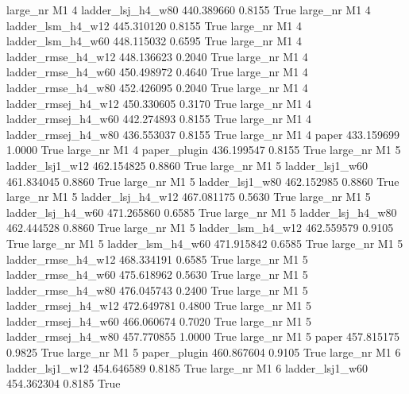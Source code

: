   large_nr       M1                 4   ladder_lsj_h4_w80  440.389660      0.8155    True
  large_nr       M1                 4   ladder_lsm_h4_w12  445.310120      0.8155    True
  large_nr       M1                 4   ladder_lsm_h4_w60  448.115032      0.6595    True
  large_nr       M1                 4  ladder_rmse_h4_w12  448.136623      0.2040    True
  large_nr       M1                 4  ladder_rmse_h4_w60  450.498972      0.4640    True
  large_nr       M1                 4  ladder_rmse_h4_w80  452.426095      0.2040    True
  large_nr       M1                 4 ladder_rmsej_h4_w12  450.330605      0.3170    True
  large_nr       M1                 4 ladder_rmsej_h4_w60  442.274893      0.8155    True
  large_nr       M1                 4 ladder_rmsej_h4_w80  436.553037      0.8155    True
  large_nr       M1                 4               paper  433.159699      1.0000    True
  large_nr       M1                 4        paper_plugin  436.199547      0.8155    True
  large_nr       M1                 5     ladder_lsj1_w12  462.154825      0.8860    True
  large_nr       M1                 5     ladder_lsj1_w60  461.834045      0.8860    True
  large_nr       M1                 5     ladder_lsj1_w80  462.152985      0.8860    True
  large_nr       M1                 5   ladder_lsj_h4_w12  467.081175      0.5630    True
  large_nr       M1                 5   ladder_lsj_h4_w60  471.265860      0.6585    True
  large_nr       M1                 5   ladder_lsj_h4_w80  462.444528      0.8860    True
  large_nr       M1                 5   ladder_lsm_h4_w12  462.559579      0.9105    True
  large_nr       M1                 5   ladder_lsm_h4_w60  471.915842      0.6585    True
  large_nr       M1                 5  ladder_rmse_h4_w12  468.334191      0.6585    True
  large_nr       M1                 5  ladder_rmse_h4_w60  475.618962      0.5630    True
  large_nr       M1                 5  ladder_rmse_h4_w80  476.045743      0.2400    True
  large_nr       M1                 5 ladder_rmsej_h4_w12  472.649781      0.4800    True
  large_nr       M1                 5 ladder_rmsej_h4_w60  466.060674      0.7020    True
  large_nr       M1                 5 ladder_rmsej_h4_w80  457.770855      1.0000    True
  large_nr       M1                 5               paper  457.815175      0.9825    True
  large_nr       M1                 5        paper_plugin  460.867604      0.9105    True
  large_nr       M1                 6     ladder_lsj1_w12  454.646589      0.8185    True
  large_nr       M1                 6     ladder_lsj1_w60  454.362304      0.8185    True
